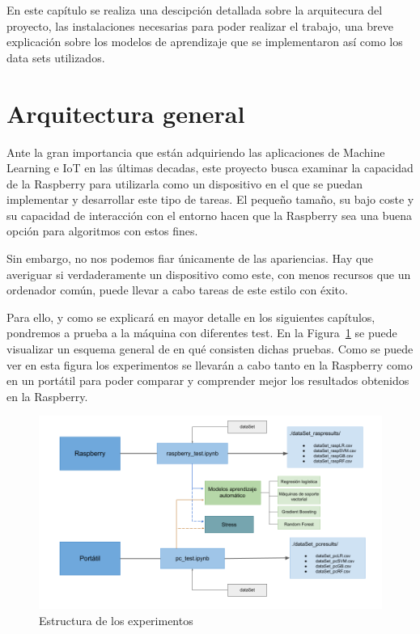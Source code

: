 \documentclass[a4paper, 12pt]{book}
\begin{document}

En este capítulo se realiza una descipción detallada sobre la arquitecura del proyecto, las instalaciones necesarias para poder realizar el trabajo, una breve explicación sobre los modelos de aprendizaje que se implementaron así como los data sets utilizados.

\section{Arquitectura general} 
\label{sec:arquitectura}

Ante la gran importancia que están adquiriendo las aplicaciones de Machine Learning e IoT en las últimas decadas, este proyecto busca examinar la capacidad de la Raspberry para utilizarla como un dispositivo en el que se puedan implementar y desarrollar este tipo de tareas. El pequeño tamaño, su bajo coste y su capacidad de interacción con el entorno hacen que la Raspberry sea una buena opción para algoritmos con estos fines. 

Sin embargo, no nos podemos fiar únicamente de las apariencias. Hay que averiguar si verdaderamente un dispositivo como este, con menos recursos que un ordenador común, puede llevar a cabo tareas de este estilo con éxito.

Para ello, y como se explicará en mayor detalle en los siguientes capítulos, pondremos a prueba a la máquina con diferentes test. En la Figura~\ref{fig:arquitectura} se puede visualizar un esquema general de en qué consisten dichas pruebas. Como se puede ver en esta figura los experimentos se llevarán a cabo tanto en la Raspberry como en un portátil para poder comparar y comprender mejor los resultados obtenidos en la Raspberry.


\begin{figure}[]
  \centering
  \includegraphics[width=14cm, keepaspectratio]{img/arquitectura_general.png}
  \caption{Estructura de los experimentos}\label{fig:arquitectura}
\end{figure}
\end{document}
